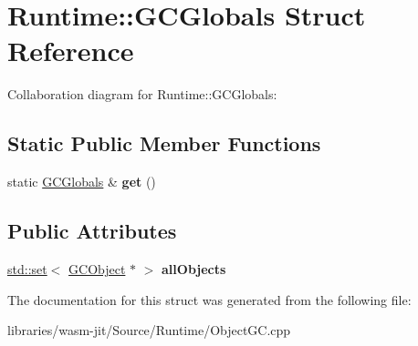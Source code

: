 \hypertarget{struct_runtime_1_1_g_c_globals}{}\section{Runtime\+:\+:G\+C\+Globals Struct Reference}
\label{struct_runtime_1_1_g_c_globals}


Collaboration diagram for Runtime\+:\+:G\+C\+Globals\+:
\subsection*{Static Public Member Functions}
\begin{DoxyCompactItemize}
\item 
\mbox{\label{struct_runtime_1_1_g_c_globals_adc50305a3ba07335cb2648eacf3d0729}} 
static \mbox{\hyperlink{struct_runtime_1_1_g_c_globals}{G\+C\+Globals}} \& {\bfseries get} ()
\end{DoxyCompactItemize}
\subsection*{Public Attributes}
\begin{DoxyCompactItemize}
\item 
\mbox{\label{struct_runtime_1_1_g_c_globals_a233f9a8b878fa2cbc9dfda96d5ce8f46}} 
\mbox{\hyperlink{classstd_1_1set}{std\+::set}}$<$ \mbox{\hyperlink{struct_runtime_1_1_g_c_object}{G\+C\+Object}} $\ast$ $>$ {\bfseries all\+Objects}
\end{DoxyCompactItemize}


The documentation for this struct was generated from the following file\+:\begin{DoxyCompactItemize}
\item 
libraries/wasm-\/jit/\+Source/\+Runtime/Object\+G\+C.\+cpp\end{DoxyCompactItemize}
